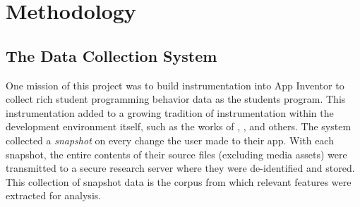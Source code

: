 \chapter{Methodology}

\section{The Data Collection System}
One mission of this project was to build instrumentation into App Inventor to collect rich student programming behavior data as the students program. This instrumentation added to a growing tradition of instrumentation within the development environment itself, such as the works of \citet{berland-2013}, \citet{lipman-phd}, and others. The system collected a \emph{snapshot} on every change the user made to their app. With each snapshot, the entire contents of their source files (excluding media assets) were transmitted to a secure research server where they were de-identified and stored. This collection of snapshot data is the corpus from which relevant features were extracted for analysis.




